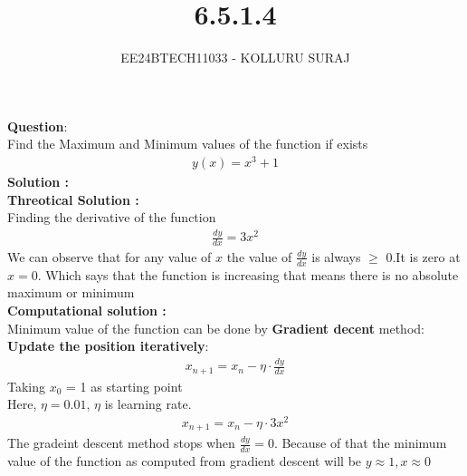 \documentclass[journal]{IEEEtran}
\begin{document}

\vspace{3cm}

\title{6.5.1.4}
\author{EE24BTECH11033 - KOLLURU SURAJ}
{\let\newpage\relax\maketitle}

\renewcommand{\thefigure}{\theenumi}
\renewcommand{\thetable}{\theenumi}
\setlength{\intextsep}{10pt} %

\renewcommand{\thetable}{\theenumi}
\textbf{Question}:\\
Find the Maximum and Minimum values of the function if exists \\
 \begin{align*}
     y (x) = x^3 + 1
 \end{align*}  
\textbf{Solution : }\\
\textbf{Threotical Solution :}\\

Finding the derivative of the function\\
\begin{align}
    \frac{dy}{dx}=3x^2
\end{align}
We can observe that for any value of $x$ the value of $\frac{dy}{dx}$ is always $\geq$ 0.It is zero at $x=0$.
Which says that the function is increasing that means there is no absolute maximum or minimum\\
\textbf{Computational solution :}\\

Minimum value of the function can be done by \textbf{Gradient decent} method:\\
\textbf{Update the position iteratively}:
\begin{align}
    x_{n+1} = x_{n} - \eta \cdot \frac{dy}{dx}
\end{align}
Taking $x_0$ = 1 as starting point\\
 Here, $\eta = 0.01$, $\eta$ is learning rate.
\begin{align}
    x_{n+1} = x_{n} - \eta \cdot 3x^2
\end{align}
The gradeint descent method stops when $\frac{dy}{dx}= 0$. Because of that the minimum value of the function as computed from gradient descent will be $y\approx 1 , x\approx 0 $
\end{document}
